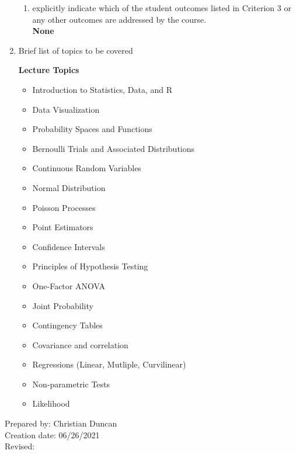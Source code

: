\begin{enumerate}[1.]
\begin{enumerate}
\item explicitly indicate which of the student outcomes listed in Criterion 3 or any other outcomes are addressed by the course.\\
  {\bfseries
    None
  }
\end{enumerate}

\item Brief list of topics to be covered\\
  {\bfseries
    Lecture Topics
    \begin{itemize}
\item Introduction to Statistics, Data, and R
\item Data Visualization
\item Probability Spaces and Functions
\item Bernoulli Trials and Associated Distributions
\item Continuous Random Variables
\item Normal Distribution
\item Poisson Processes
\item Point Estimators
\item Confidence Intervals
\item Principles of Hypothesis Testing
\item One-Factor ANOVA
\item Joint Probability
\item Contingency Tables
\item Covariance and correlation
\item Regressions (Linear, Mutliple, Curvilinear)
\item Non-parametric Tests
\item Likelihood
\end{itemize}
  }

\end{enumerate}

\noindent Prepared by: Christian Duncan\\
\noindent Creation date: 06/26/2021\\
\noindent Revised:\\
